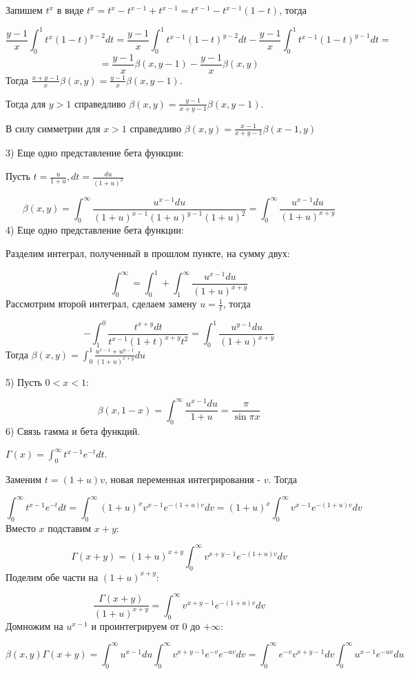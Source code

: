 \documentclass[12pt]{article}
\begin{document}
Запишем $t^x$ в виде $t^{x} = t^x - t^{x-1} + t^{x-1} = t^{x-1} - t^{x-1}(1-t)$, тогда\par
$$\frac{y-1}{x} \int_0^1 t^{x} (1-t)^{y-2} dt = \frac{y-1}{x} \int_0^1 t^{x - 1} (1-t)^{y-2} dt - \frac{y-1}{x} \int_0^1 t^{x-1} (1-t)^{y-1} dt=$$
$$= \frac{y-1}{x} \beta(x,y-1) - \frac{y-1}{x} \beta(x,y)$$
Тогда $\frac{x+y-1}{x} \beta(x,y) = \frac{y-1}{x} \beta(x,y-1)$.\par
Тогда для $y>1$ справедливо $\beta(x,y) = \frac{y-1}{x+y-1} \beta(x,y-1)$.\par
В силу симметрии для $x>1$ справедливо $\beta(x,y) = \frac{x-1}{x+y-1} \beta(x-1, y)$\par
3) Еще одно представление бета функции:\par
Пусть $t = \frac{u}{1+u}, dt = \frac{du}{(1+u)^2}$\par
$$\beta(x,y) = \int_0^\infty \frac{u^{x-1}du}{(1+u)^{x-1}(1+u)^{y-1}(1+u)^2} = \int_0^{\infty} \frac{u^{x-1} du}{(1+u)^{x+y}}$$
4) Еще одно представление бета функции:\par
Разделим интеграл, полученный в прошлом пункте, на сумму двух:\par
$$\int_0^\infty = \int_0^1 + \int_1^\infty \frac{u^{x-1} du}{(1+u)^{x+y}}$$
Рассмотрим второй интеграл, сделаем замену $u = \frac{1}{t}$, тогда\par
$$-\int_1^0 \frac{t^{x+y} dt}{t^{x-1}(1+t)^{x+y}t^2} = \int_0^1 \frac{u^{y-1}du}{(1+u)^{x+y}}$$
Тогда $\beta(x,y) = \int_0^1 \frac{u^{x-1} + u^{y-1}}{(1+u)^{x+y}} du$\par
5) Пусть $0 < x < 1$:\par
$$\beta(x, 1-x) = \int_0^\infty \frac{u^{x-1} du}{1+u} = \frac{\pi}{\sin{\pi x}}$$
6) Связь гамма и бета функций.\par
$\Gamma(x) = \int_0^\infty t^{x-1} e^{-t} dt$.\par
Заменим $t = (1+u) v$, новая переменная интегрирования - $v$. Тогда\par
$$\int_0^\infty t^{x-1} e^{-t} dt = \int_0^\infty (1+u)^x v^{x-1} e^{-(1+u)v} dv = (1+u)^x \int_0^\infty v^{x-1} e^{-(1+u)v} dv$$
Вместо $x$ подставим $x + y$:\par
$$\Gamma(x+y) = (1+u)^{x+y} \int_0^\infty v^{x+y-1} e^{-(1+u)v} dv$$
Поделим обе части на $(1+u)^{x+y}$:\par
$$\frac{\Gamma(x+y)}{(1+u)^{x+y}} = \int_0^\infty v^{x+y-1} e^{-(1+u)v} dv$$
Домножим на $u^{x-1}$ и проинтегрируем от $0$ до $+\infty$:\par
$$\beta(x,y) \Gamma(x+y) = \int_0^\infty u^{x-1} du \int_0^\infty v^{x+y-1} e^{-v} e^{-uv} dv = \int_0^\infty e^{-v} v^{x+y-1} dv \int_0^\infty u^{x-1} e^{-uv} du$$
\end{document}
